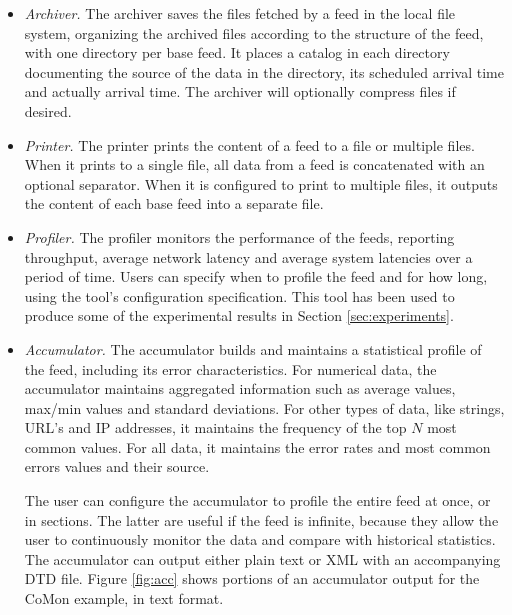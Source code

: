 \begin{itemize}
\item {\em Archiver.} The archiver saves the files fetched by a feed 
in the local file system, organizing the archived files
according to the structure of the feed, with one directory per base feed. 
It places a catalog in each directory documenting the source of 
the data in the directory, its scheduled arrival time and
actually arrival time. The archiver will optionally compress
files if desired.

\item {\em Printer.} The printer prints the content of a feed to a file or
multiple files. When it prints to a single file, all data from a feed is
concatenated with an optional separator. When it is configured to print
to multiple files, it outputs the content of each base feed into a separate
file.

\item {\em Profiler.} The profiler monitors the performance of the feeds, reporting
throughput, average network latency and average system latencies
over a period of time. Users can specify when to profile the feed and
for how long, using the tool's configuration specification. 
This tool has been used to produce some of the experimental 
results in Section \ref{sec:experiments}.

\item {\em Accumulator.} The accumulator builds and maintains a statistical profile of the feed, including its error characteristics. For numerical data, the accumulator maintains aggregated information such as 
average values, max/min values and standard deviations. For other
types of data, like strings, URL's and IP addresses, it maintains the frequency of the top $N$
most common values. For all data, it maintains the error rates and most common errors values and their source.

The user can configure the accumulator to profile the entire feed at once, or in sections. The latter are
useful if the feed is infinite, because they allow the user to continuously monitor the data and compare with historical statistics. 
The accumulator can output either plain text or XML with an
accompanying DTD file. Figure \ref{fig:acc} shows portions of an accumulator
output for the CoMon example, in text format.


\end{itemize}
